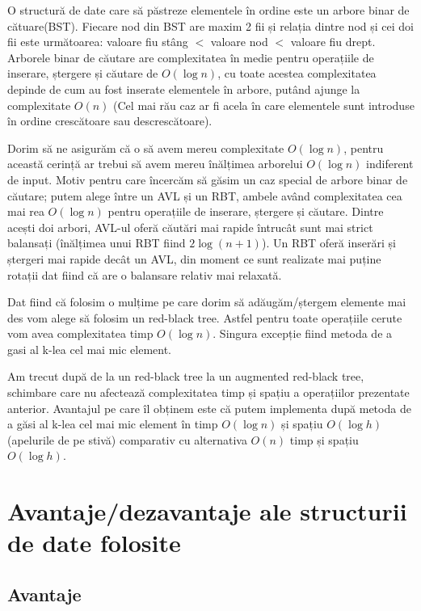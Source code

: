 \documentclass[]{report}
\begin{document}
	O structură de date care să păstreze elementele în ordine este un arbore
	binar de cătuare(BST). Fiecare nod din BST are maxim 2 fii și relația dintre
	nod și cei doi fii este următoarea: valoare fiu stâng $<$ valoare nod $<$
	valoare fiu drept. Arborele binar de căutare are complexitatea în medie 
	pentru operațiile de inserare, ștergere și căutare de $O(\log n)$, cu toate
	acestea complexitatea depinde de cum au fost inserate elementele în arbore,
	putând ajunge la complexitate $O(n)$ (Cel mai rău caz ar fi acela în care
	elementele sunt introduse în ordine crescătoare sau descrescătoare).

	Dorim să ne asigurăm că o să avem mereu complexitate $O(\log n)$, pentru
	această cerință ar trebui să avem mereu înălțimea arborelui $O(\log n)$
	indiferent de input. Motiv pentru care încercăm să găsim un caz special de
	arbore binar de căutare; putem alege între un AVL și un RBT, ambele având
	complexitatea cea mai rea $O(\log n)$ pentru operațiile de inserare, ștergere
	și căutare. Dintre acești doi arbori, AVL-ul oferă căutări mai rapide întrucât
	sunt mai strict balansați (înălțimea unui RBT fiind $2\log(n+1)$). Un RBT
	oferă inserări și ștergeri mai rapide decât un AVL, din moment ce sunt
	realizate mai puține rotații dat fiind că are o balansare relativ mai relaxată.

	Dat fiind că folosim o mulțime pe care dorim să adăugăm/ștergem elemente mai des
	vom	alege să folosim un red-black tree. Astfel pentru toate operațiile cerute
	vom avea complexitatea timp $O(\log n)$. Singura excepție fiind metoda de a
	gasi al k-lea cel mai mic element.

	Am trecut după de la un red-black tree la un augmented red-black tree,
	schimbare care nu afectează complexitatea timp și spațiu a operațiilor
	prezentate anterior. Avantajul pe care îl obținem este că putem implementa
	după metoda de a găsi al k-lea cel mai mic element în timp $O(\log n)$ și
	spațiu $O(\log h)$(apelurile de pe stivă) comparativ cu alternativa $O(n)$
	timp și	spațiu $O(\log h)$.

	\chapter*{Avantaje/dezavantaje ale structurii de date folosite}

	\section*{Avantaje}
	
\end{document}
